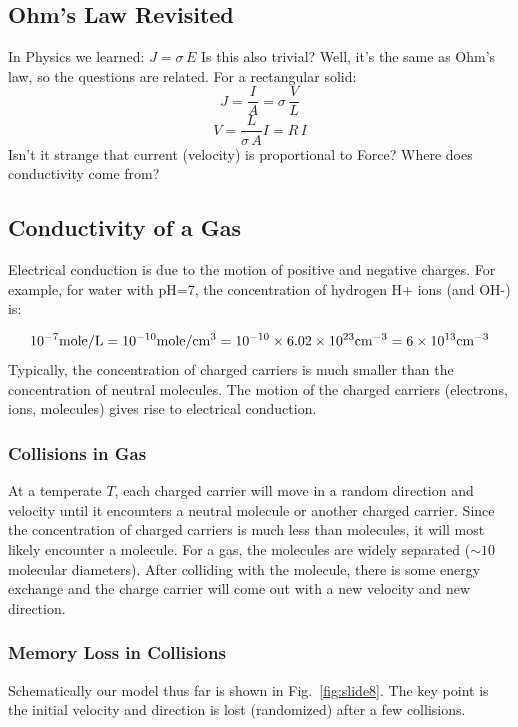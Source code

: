 \subsection{Ohm’s Law Revisited}
 In Physics we learned:  $J = \sigma \,E$  Is this also trivial? Well, it’s the same as Ohm’s law, so the questions are related. For a rectangular solid:
\begin{equation}
        J = \frac{I}{A} = \sigma \,\frac{V}{L} \end{equation}\begin{equation}  V = \frac{L}{{\sigma \,A}}I = R\,I
\end{equation}
Isn’t it strange that current (velocity) is proportional to Force?  Where does conductivity come from?


\subsection{Conductivity of a Gas}


Electrical conduction is due to the motion of positive and negative charges.   For example, for  water with pH=7, the concentration of hydrogen H+ ions (and OH-) is:


\begin{equation}
{10^{ - 7}}{\rm{mole/L}} = {\rm{1}}{{\rm{0}}^{{\rm{ - 10}}}}{\rm{mole/c}}{{\rm{m}}^{\rm{3}}}
= {\rm{1}}{{\rm{0}}^{{\rm{ - 10}}}} \times 6.02 \times {10^{23}}{\rm{c}}{{\rm{m}}^{ - 3}}
= 6 \times {10^{13}}{\rm{c}}{{\rm{m}}^{ - 3}}
\end{equation}
Typically, the concentration of charged carriers is much smaller than the concentration of neutral molecules.   The motion of the charged carriers (electrons, ions, molecules) gives rise to electrical conduction.


\subsubsection{Collisions in Gas}


At a temperate $T$, each charged carrier will move in a random direction and velocity until it encounters a neutral molecule or another charged carrier.  Since the concentration of charged carriers is much less than molecules, it will most likely encounter a molecule. For a gas, the molecules are widely separated ($\sim 10$ molecular diameters).  After colliding with the molecule, there is some energy exchange and the charge carrier will come out with a new velocity and new direction.
\subsubsection{Memory Loss in Collisions}
 Schematically our model thus far is shown in Fig.~\ref{fig:slide8}.   The key point is the initial velocity and direction is lost (randomized) after a few collisions.




